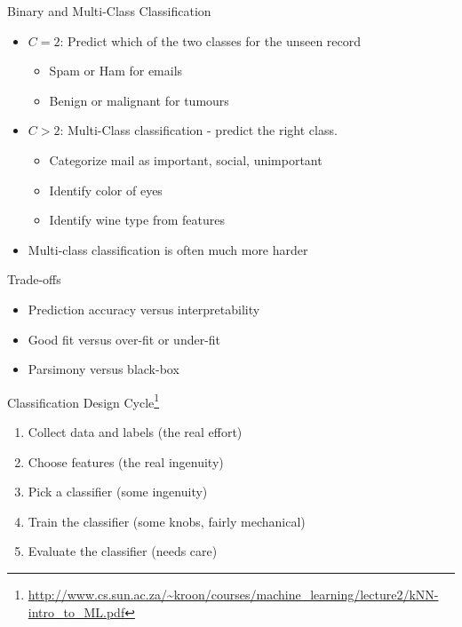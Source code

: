 \documentclass{beamer}
\newcommand{\furl}[1]{{\footnote{\url{#1}}}}
\begin{document}
\begin{frame}{Binary and Multi-Class Classification}
    \begin{itemize}
        \item $C=2$: Predict which of the two classes for the unseen record 
        \begin{itemize}
            \item Spam or Ham for emails
            \item Benign or malignant for tumours
        \end{itemize}
        \item $C > 2$: Multi-Class classification - predict the right class.
        \begin{itemize}
            \item Categorize mail as important, social, unimportant
            \item Identify color of eyes
            \item Identify wine type from features
        \end{itemize}
        \item Multi-class classification is often much more harder
    \end{itemize}
\end{frame}

\begin{frame}{Trade-offs}
    \begin{itemize}
        \item Prediction accuracy versus interpretability
        \item Good fit versus over-fit or under-fit
        \item Parsimony versus black-box
    \end{itemize}
\end{frame}

\begin{frame}{Classification Design Cycle\furl{http://www.cs.sun.ac.za/~kroon/courses/machine_learning/lecture2/kNN-intro_to_ML.pdf}}
    \begin{enumerate}
        \item Collect data and labels (the real effort)
        \item Choose features (the real ingenuity)
        \item Pick a classifier (some ingenuity)
        \item Train the classifier (some knobs, fairly mechanical)
        \item Evaluate the classifier (needs care)
    \end{enumerate}
\end{frame}
\end{document}
